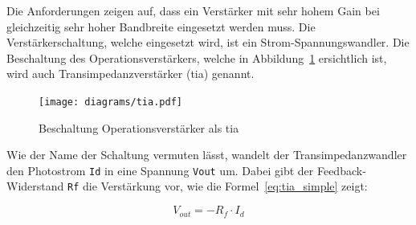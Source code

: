 Die Anforderungen zeigen auf, dass ein Verstärker mit sehr hohem Gain bei gleichzeitig sehr hoher Bandbreite eingesetzt werden muss.
Die Verstärkerschaltung, welche eingesetzt wird, ist ein Strom-Spannungswandler. Die Beschaltung des Operationsverstärkers,
welche in Abbildung~\ref{fig:theory_tia} ersichtlich ist, wird auch Transimpedanzverstärker (\acrshort{tia}) genannt.

\begin{figure}[H]
    \centering
    \texttt{[image: diagrams/tia.pdf]}
    \caption{Beschaltung Operationsverstärker als \acrshort{tia}}\label{fig:theory_tia}
\end{figure}

Wie der Name der Schaltung vermuten lässt, wandelt der Transimpedanzwandler den Photostrom \lstinline|Id| in eine Spannung
\lstinline|Vout| um. Dabei gibt der Feedback-Widerstand \lstinline|Rf| die Verstärkung vor, wie die Formel~\ref{eq:tia_simple}
zeigt:

\begin{equation}\label{eq:tia_simple}
    V_{out} = -R_{f} \cdot I_{d}
\end{equation}
